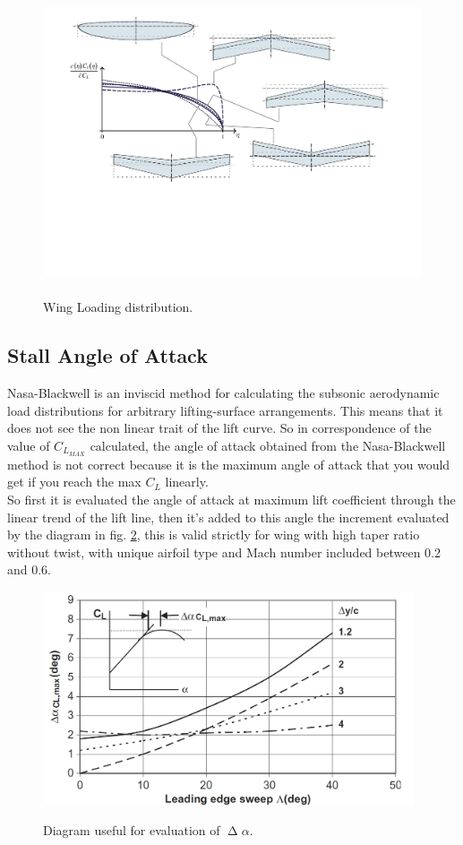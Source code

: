 \begin{figure}[H]
\centering
{\includegraphics[height=8.3cm]{Immagini/wing_loading_B}} 
\caption{Wing Loading distribution.}
\label{fig:wl}
\end{figure}

\subsection{Stall Angle of Attack}

Nasa-Blackwell is an inviscid method for calculating the subsonic aerodynamic load distributions for arbitrary lifting-surface arrangements. This means that it does not see the non linear trait of the lift curve. So in correspondence of the value of $C_{L_{MAX}}$ calculated, the angle of attack obtained from the Nasa-Blackwell method is not correct because it is the maximum angle of attack that you would get if you reach the max $C_L$ linearly.\\
So first it is evaluated the angle of attack at maximum lift coefficient through the linear trend of the lift line, then it’s added to this angle the increment evaluated by the diagram in fig. \ref{fig:dealpha}, this is valid strictly for wing with high taper ratio without twist, with unique airfoil type and Mach number included between 0.2 and 0.6.


\begin{figure}[H]
\centering
{\includegraphics[height=6.3cm]{Immagini/deltaAlphaSforza.png}} 
\caption{Diagram useful for evaluation of $\upDelta \alpha$.}
\label{fig:dealpha}
\end{figure}



